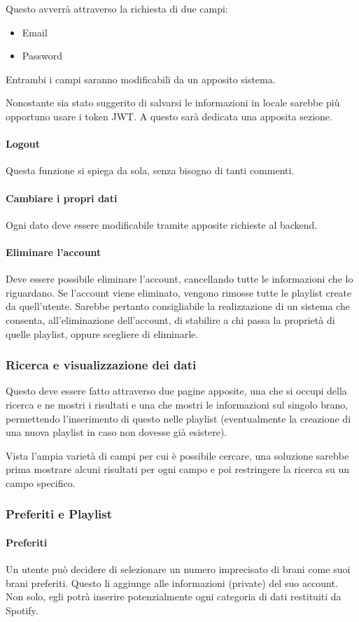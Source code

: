 Questo avverrà attraverso la richiesta di due campi:
\begin{itemize}
    \item Email
    \item Password
\end{itemize}
Entrambi i campi saranno modificabili da un apposito sistema.

Nonostante sia stato suggerito di salvarsi le informazioni in locale sarebbe più opportuno usare i token JWT. A questo sarà dedicata una apposita sezione.
\paragraph{Logout} Questa funzione si spiega da sola, senza bisogno di tanti commenti.
\paragraph{Cambiare i propri dati} Ogni dato deve essere modificabile tramite apposite richieste al backend.
\paragraph{Eliminare l'account} Deve essere possibile eliminare l'account, cancellando tutte le informazioni che lo riguardano. Se l'account viene eliminato, vengono rimosse tutte le playlist create da quell'utente. Sarebbe pertanto consigliabile la realizzazione di un sistema che consenta, all'eliminazione dell'account, di stabilire a chi passa la proprietà di quelle playlist, oppure scegliere di eliminarle.
\subsubsection{Ricerca e visualizzazione dei dati}
Questo deve essere fatto attraverso due pagine apposite, una che si occupi della ricerca e ne mostri i risultati e una che mostri le informazioni sul singolo brano, permettendo l'inserimento di questo nelle playlist (eventualmente la creazione di una nuova playlist in caso non dovesse già esistere).

Vista l'ampia varietà di campi per cui è possibile cercare, una soluzione sarebbe prima mostrare alcuni risultati per ogni campo e poi restringere la ricerca su un campo specifico.
\subsubsection{Preferiti e Playlist}
\paragraph{Preferiti} Un utente può decidere di selezionare un numero imprecisato di brani come suoi brani preferiti. Questo li aggiunge alle informazioni (private) del suo account. Non solo, egli potrà inserire potenzialmente ogni categoria di dati restituiti da Spotify.
